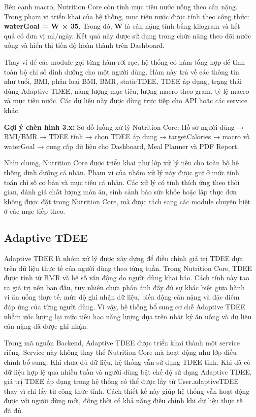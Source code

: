 \documentclass[12pt, a4paper]{report}
\begin{document}
Bên cạnh macro, Nutrition Core còn tính mục tiêu nước uống theo cân nặng. Trong phạm vi triển khai của hệ thống, mục tiêu nước được tính theo công thức: \textbf{waterGoal = W × 35}. Trong đó, \textbf{W} là cân nặng tính bằng kilogram và kết quả có đơn vị ml/ngày. Kết quả này được sử dụng trong chức năng theo dõi nước uống và hiển thị tiến độ hoàn thành trên Dashboard.

Thay vì để các module gọi từng hàm rời rạc, hệ thống có hàm tổng hợp để tính toàn bộ chỉ số dinh dưỡng cho một người dùng. Hàm này trả về các thông tin như tuổi, BMI, phân loại BMI, BMR, staticTDEE, TDEE áp dụng, trạng thái dùng Adaptive TDEE, năng lượng mục tiêu, lượng macro theo gram, tỷ lệ macro và mục tiêu nước. Các dữ liệu này được dùng trực tiếp cho API hoặc các service khác.

\textbf{Gợi ý chèn hình 3.x:} Sơ đồ luồng xử lý Nutrition Core: Hồ sơ người dùng → BMI/BMR → TDEE tĩnh → chọn TDEE áp dụng → targetCalories → macro và waterGoal → cung cấp dữ liệu cho Dashboard, Meal Planner và PDF Report.

Nhìn chung, Nutrition Core được triển khai như lớp xử lý nền cho toàn bộ hệ thống dinh dưỡng cá nhân. Phạm vi của nhóm xử lý này được giữ ở mức tính toán chỉ số cơ bản và mục tiêu cá nhân. Các xử lý có tính thích ứng theo thời gian, đánh giá chất lượng món ăn, sinh cảnh báo sức khỏe hoặc lập thực đơn không được đặt trong Nutrition Core, mà được tách sang các module chuyên biệt ở các mục tiếp theo.

\subsection{Adaptive TDEE}Adaptive TDEE là nhóm xử lý được xây dựng để điều chỉnh giá trị TDEE dựa trên dữ liệu thực tế của người dùng theo từng tuần. Trong Nutrition Core, TDEE được tính từ BMR và hệ số vận động do người dùng khai báo. Cách tính này tạo ra giá trị nền ban đầu, tuy nhiên chưa phản ánh đầy đủ sự khác biệt giữa hành vi ăn uống thực tế, mức độ ghi nhận dữ liệu, biến động cân nặng và đặc điểm đáp ứng của từng người dùng. Vì vậy, hệ thống bổ sung cơ chế Adaptive TDEE nhằm ước lượng lại mức tiêu hao năng lượng dựa trên nhật ký ăn uống và dữ liệu cân nặng đã được ghi nhận.

Trong mã nguồn Backend, Adaptive TDEE được triển khai thành một service riêng. Service này không thay thế Nutrition Core mà hoạt động như lớp điều chỉnh bổ sung. Khi chưa đủ dữ liệu, hệ thống vẫn sử dụng TDEE tĩnh. Khi đã có dữ liệu hợp lệ qua nhiều tuần và người dùng bật chế độ sử dụng Adaptive TDEE, giá trị TDEE áp dụng trong hệ thống có thể được lấy từ User.adaptiveTDEE thay vì chỉ lấy từ công thức tĩnh. Cách thiết kế này giúp hệ thống vẫn hoạt động được với người dùng mới, đồng thời có khả năng điều chỉnh khi dữ liệu thực tế đã đủ.
\end{document}
